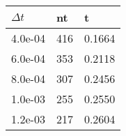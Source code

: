 \begin{tabular}{lll}
$\Delta t$ & nt & t \\ 
\hline 
4.0e-04 & 416 & 0.1664 \\ 
6.0e-04 & 353 & 0.2118 \\ 
8.0e-04 & 307 & 0.2456 \\ 
1.0e-03 & 255 & 0.2550 \\ 
1.2e-03 & 217 & 0.2604 \\ 
\hline 
\end{tabular}